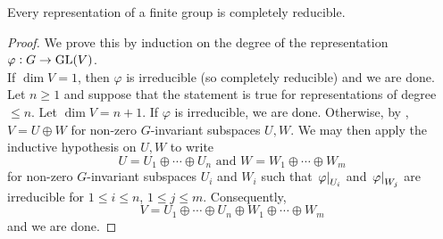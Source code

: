 			\begin{ftheo}
				\label{theo: maschke's theorem}
				Every representation of a finite group is completely reducible.
			\end{ftheo}
			\begin{proof}
				We prove this by induction on the degree of the representation $\varphi : G \to \operatorname{GL}(V)$. \\
				If $\dim V = 1$, then $\varphi$ is irreducible (so completely reducible) and we are done. \\
				Let $n \ge 1$ and suppose that the statement is true for representations of degree $\le n$. Let $\dim V = n+1$. If $\varphi$ is irreducible, we are done. Otherwise, by , $V = U \oplus W$ for non-zero $G$-invariant subspaces $U,W$. We may then apply the inductive hypothesis on $U,W$ to write
				\[ U = U_1 \oplus \cdots \oplus U_n \text{ and } W = W_1 \oplus \cdots \oplus W_m \]
				for non-zero $G$-invariant subspaces $U_i$ and $W_i$ such that $\left.\varphi\right|_{U_i}$ and $\left.\varphi\right|_{W_j}$ are irreducible for $1 \le i \le n$, $1 \le j \le m$. Consequently,
				\[ V = U_1 \oplus \cdots \oplus U_n \oplus W_1 \oplus \cdots \oplus W_m \]
				and we are done.
			\end{proof}

\clearpage